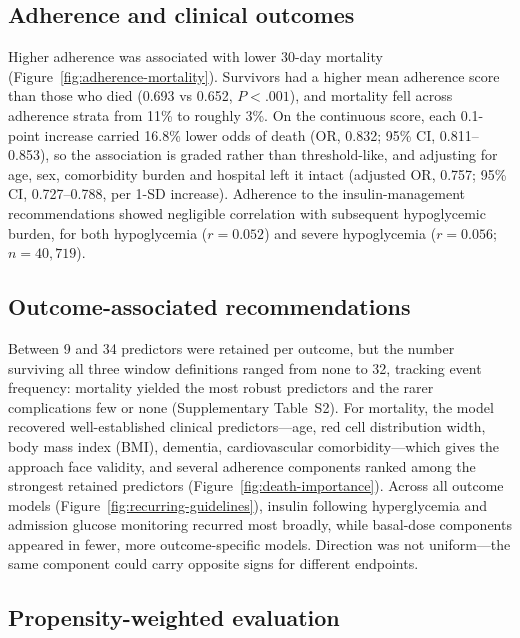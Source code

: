 \subsection{Adherence and clinical outcomes}

Higher adherence was associated with lower 30-day mortality
(Figure~\ref{fig:adherence-mortality}). Survivors had a higher mean adherence
score than those who died (0.693 vs 0.652, $P<.001$), and mortality fell across
adherence strata from 11\% to roughly 3\%. On the continuous score, each
0.1-point increase carried 16.8\% lower odds of death (OR, 0.832; 95\% CI,
0.811--0.853), so the association is graded rather than threshold-like, and
adjusting for age, sex, comorbidity burden and hospital left it intact
(adjusted OR, 0.757; 95\% CI, 0.727--0.788, per 1-SD increase). Adherence to the insulin-management
recommendations showed negligible correlation with subsequent hypoglycemic
burden, for both hypoglycemia ($r=0.052$) and severe hypoglycemia ($r=0.056$;
$n=40{,}719$).

\subsection{Outcome-associated recommendations}

Between 9 and 34 predictors were retained per outcome, but the number
surviving all three window definitions ranged from none to 32, tracking event
frequency: mortality yielded the most robust predictors and the rarer
complications few or none (Supplementary Table~S2). For mortality, the model
recovered well-established clinical predictors---age, red cell distribution
width, body mass index (BMI), dementia, cardiovascular comorbidity---which
gives the approach face validity, and several adherence components ranked among
the strongest retained predictors (Figure~\ref{fig:death-importance}). Across
all outcome models (Figure~\ref{fig:recurring-guidelines}), insulin following
hyperglycemia and admission glucose monitoring recurred most broadly, while
basal-dose components appeared in fewer, more outcome-specific models.
Direction was not uniform---the same component could carry opposite signs for
different endpoints.

\subsection{Propensity-weighted evaluation}


